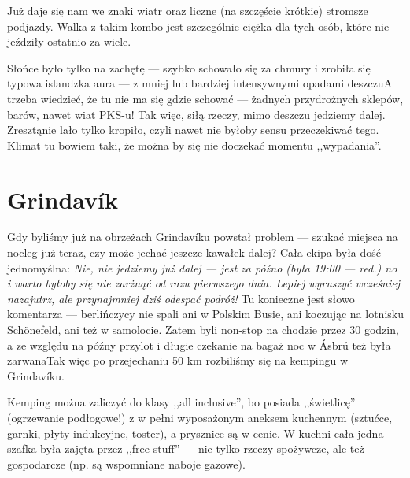 Już daje się nam we znaki wiatr oraz liczne (na szczęście krótkie) stromsze podjazdy. Walka z takim kombo jest szczególnie ciężka dla tych osób, które nie jeździły ostatnio za wiele.


Słońce było tylko na zachętę --- szybko schowało się za chmury i zrobiła się typowa islandzka aura --- z mniej lub bardziej intensywnymi opadami deszczu\textellipsis A trzeba wiedzieć, że tu nie ma się gdzie schować --- żadnych przydrożnych sklepów, barów, nawet wiat PKS-u! Tak więc, siłą rzeczy, mimo deszczu jedziemy dalej. Zresztą\textellipsis nie lało tylko kropiło, czyli nawet nie byłoby sensu przeczekiwać tego. Klimat tu bowiem taki, że można by się nie doczekać momentu ,,wypadania''.

\section*{Grindavík}

Gdy byliśmy już na obrzeżach Grindavíku powstał problem --- szukać miejsca na nocleg już teraz, czy może jechać jeszcze kawałek dalej? Cała ekipa była dość jednomyślna: \emph{Nie, nie jedziemy już dalej --- jest za późno (była 19:00 --- red.) no i warto byłoby się nie zarżnąć od razu pierwszego dnia. Lepiej wyruszyć wcześniej nazajutrz, ale przynajmniej dziś odespać podróż!} Tu konieczne jest słowo komentarza --- berlińczycy nie spali ani w Polskim Busie, ani koczując na lotnisku Schönefeld, ani też w samolocie. Zatem byli non-stop na chodzie przez 30 godzin, a ze względu na późny przylot i długie czekanie na bagaż noc w Ásbrú też była zarwana\textellipsis Tak więc po przejechaniu 50 km rozbiliśmy się na kempingu w Grindavíku.

Kemping można zaliczyć do klasy ,,all inclusive'', bo posiada ,,świetlicę'' (ogrzewanie podłogowe!) z w pełni wyposażonym aneksem kuchennym (sztućce, garnki, płyty indukcyjne, toster\textellipsis), a prysznice są w cenie. W kuchni cała jedna szafka była zajęta przez ,,free stuff'' --- nie tylko rzeczy spożywcze, ale też gospodarcze (np. są wspomniane naboje gazowe).

